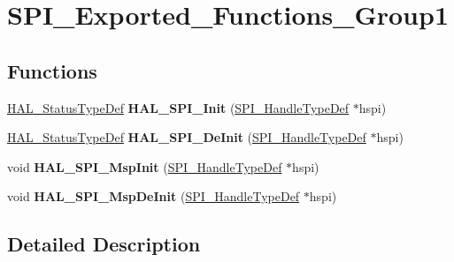 \hypertarget{group___s_p_i___exported___functions___group1}{}\section{S\+P\+I\+\_\+\+Exported\+\_\+\+Functions\+\_\+\+Group1}
\label{group___s_p_i___exported___functions___group1}
\subsection*{Functions}
\begin{DoxyCompactItemize}
\item 
\hyperlink{stm32f4xx__hal__def_8h_a63c0679d1cb8b8c684fbb0632743478f}{H\+A\+L\+\_\+\+Status\+Type\+Def} {\bfseries H\+A\+L\+\_\+\+S\+P\+I\+\_\+\+Init} (\hyperlink{group___s_p_i___exported___types_gab633e49dd034de2f3a1fe79853d78d18}{S\+P\+I\+\_\+\+Handle\+Type\+Def} $\ast$hspi)\hypertarget{group___s_p_i___exported___functions___group1_gaadb9d40e710c714d96b2501996658c44}{}\label{group___s_p_i___exported___functions___group1_gaadb9d40e710c714d96b2501996658c44}

\item 
\hyperlink{stm32f4xx__hal__def_8h_a63c0679d1cb8b8c684fbb0632743478f}{H\+A\+L\+\_\+\+Status\+Type\+Def} {\bfseries H\+A\+L\+\_\+\+S\+P\+I\+\_\+\+De\+Init} (\hyperlink{group___s_p_i___exported___types_gab633e49dd034de2f3a1fe79853d78d18}{S\+P\+I\+\_\+\+Handle\+Type\+Def} $\ast$hspi)\hypertarget{group___s_p_i___exported___functions___group1_gaca2db2a7bbed96ac013c565080fb61f2}{}\label{group___s_p_i___exported___functions___group1_gaca2db2a7bbed96ac013c565080fb61f2}

\item 
void {\bfseries H\+A\+L\+\_\+\+S\+P\+I\+\_\+\+Msp\+Init} (\hyperlink{group___s_p_i___exported___types_gab633e49dd034de2f3a1fe79853d78d18}{S\+P\+I\+\_\+\+Handle\+Type\+Def} $\ast$hspi)\hypertarget{group___s_p_i___exported___functions___group1_ga17f583be14b22caffa6c4e56dcd035ef}{}\label{group___s_p_i___exported___functions___group1_ga17f583be14b22caffa6c4e56dcd035ef}

\item 
void {\bfseries H\+A\+L\+\_\+\+S\+P\+I\+\_\+\+Msp\+De\+Init} (\hyperlink{group___s_p_i___exported___types_gab633e49dd034de2f3a1fe79853d78d18}{S\+P\+I\+\_\+\+Handle\+Type\+Def} $\ast$hspi)\hypertarget{group___s_p_i___exported___functions___group1_gabadc4d4974af1afd943e8d13589068e1}{}\label{group___s_p_i___exported___functions___group1_gabadc4d4974af1afd943e8d13589068e1}

\end{DoxyCompactItemize}


\subsection{Detailed Description}

